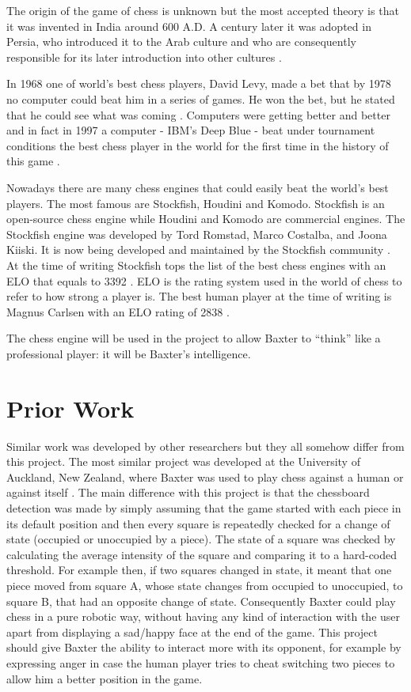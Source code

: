 \documentclass{l4proj}
\begin{document}
The origin of the game of chess is unknown but the most accepted theory is that it was invented in India around 600 A.D. A century later it was adopted in Persia, who introduced it to the Arab culture and who are consequently responsible for its later introduction into other cultures \cite{ChessOrigins}.

In 1968 one of world's best chess players, David Levy, made a bet that by 1978 no computer could beat him in a series of games. He won the bet, but he stated that he could see what was coming \cite{LevyBet}. Computers were getting better and better and in fact in 1997 a computer - IBM's Deep Blue - beat under tournament conditions the best chess player in the world for the first time in the history of this game \cite{DeepBlue}.

Nowadays there are many chess engines that could easily beat the world's best players. The most famous are Stockfish, Houdini and Komodo. Stockfish is an open-source chess engine while Houdini and Komodo are commercial engines. The Stockfish engine was developed by Tord Romstad, Marco Costalba, and Joona Kiiski. It is now being developed and maintained by the Stockfish community \cite{StockfishHP}. At the time of writing Stockfish tops the list of the best chess engines with an ELO that equals to 3392 \cite{EngineTable}. ELO is the rating system used in the world of chess to refer to how strong a player is. The best human player at the time of writing is Magnus Carlsen with an ELO rating of 2838 \cite{BestPlayers}.

The chess engine will be used in the project to allow Baxter to “think” like a professional player: it will be Baxter's intelligence.

\section{Prior Work}

Similar work was developed by other researchers but they all somehow differ from this project. The most similar project was developed at the University of Auckland, New Zealand, where Baxter was used to play chess against a human or against itself \cite{SimilarProject}. The main difference with this project is that the chessboard detection was made by simply assuming that the game started with each piece in its default position and then every square is repeatedly checked for a change of state (occupied or unoccupied by a piece). The state of a square was checked by calculating the average intensity of the square and comparing it to a hard-coded threshold. For example then, if two squares changed in state, it meant that one piece moved from square A, whose state changes from occupied to unoccupied, to square B, that had an opposite change of state. Consequently Baxter could play chess in a pure robotic way, without having any kind of interaction with the user apart from displaying a sad/happy face at the end of the game. This project should give Baxter the ability to interact more with its opponent, for example by expressing anger in case the human player tries to cheat switching two pieces to allow him a better position in the game. 
\end{document}
